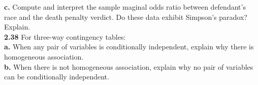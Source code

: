\documentclass[paper=letter, fontsize=11pt]{scrartcl} %
\begin{document}
\textbf{c.} Compute and interpret the sample maginal odds ratio between defendant's race
and the death penalty verdict. Do these data exhibit Simpson's paradox? Explain. \\

\textbf{2.38} For three-way contingency tables: \\

\textbf{a.} When any pair of variables is conditionally independent, explain why there is
homogeneous association. \\

\textbf{b.} When there is not homogeneous association, explain why no pair of variables can
be conditionally independent. \\
\end{document}
